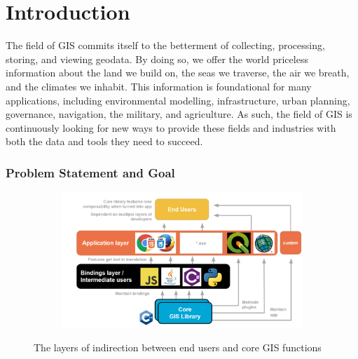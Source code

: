 \chapter{Introduction}
\label{chap:intro}

\graphicspath{{../../assets/images/1/}}

The field of \ac{GIS} commits itself to the betterment of collecting, processing, storing, and viewing geodata. 
By doing so, we offer the world priceless information about the land we build on, the seas we traverse, the air we breath, and the climates we inhabit. 
This information is foundational for many applications, including environmental modelling, infrastructure, urban planning, governance, navigation, the military, and agriculture.   
As such, the field of \ac{GIS} is continuously looking for new ways to provide these fields and industries with both the data and tools they need to succeed. 

\subsection*{Problem Statement and Goal}

\begin{figure}
  \centering
  \begin{subfigure}[b]{\linewidth}
    \includegraphics[width=\linewidth]{layers.png}
  \end{subfigure}%
  \caption{The layers of indirection between end users and core GIS functions}
  \label{fig:problem-statement}
\end{figure}

